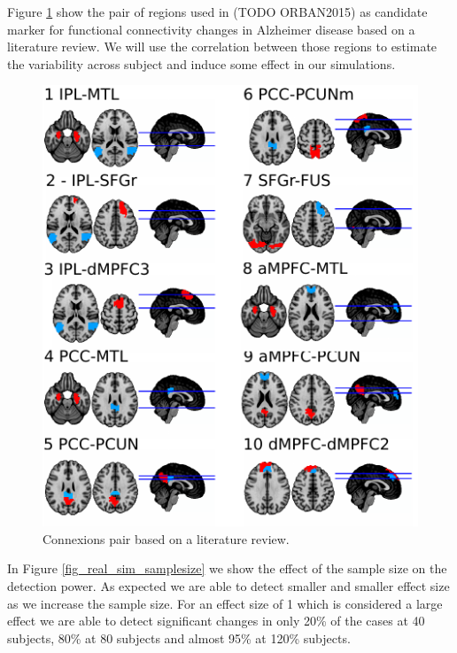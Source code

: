 \documentclass[authoryear]{elsarticle}
\begin{document}
Figure \ref{fig_p2p} show the pair of regions used in (TODO ORBAN2015) as candidate marker for functional connectivity changes in Alzheimer disease based on a literature review. We will use the correlation between those regions to estimate the variability across subject and induce some effect in our simulations.

\begin{figure}[tbp]
\begin{center}
\includegraphics[width=0.5\linewidth]{../figures/p2p_seeds.pdf}
\end{center}
\caption{
Connexions pair based on a literature review.
}
\label{fig_p2p}
\end{figure}


In Figure \ref{fig_real_sim_samplesize} we show the effect of the sample size on the detection power. As expected we are able to detect smaller and smaller effect size as we increase the sample size. For an effect size of 1 which is considered a large effect we are able to detect significant changes in only 20\% of the cases at 40 subjects, 80\% at 80 subjects and almost 95\% at 120\% subjects.
\end{document}
